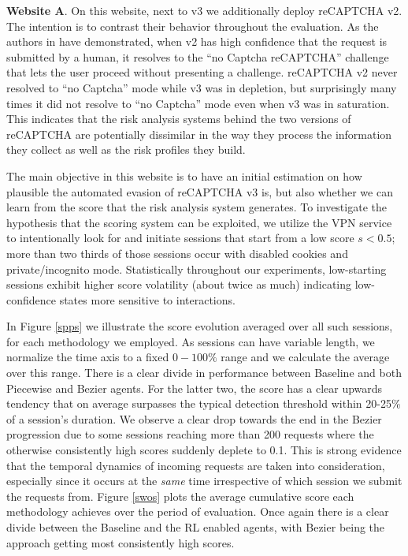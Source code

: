 \textbf{Website A}. On this website, next to v3 we additionally deploy reCAPTCHA v2.
The intention is to contrast their behavior throughout the evaluation.
As the authors in \cite{sivakorn2016robot} have demonstrated, when v2 has high confidence that the request is submitted by a human, it resolves to the ``no Captcha reCAPTCHA'' challenge that lets the user proceed without presenting a challenge.
reCAPTCHA v2 never resolved to ``no Captcha'' mode while v3 was in depletion, but surprisingly many times it did not resolve to ``no Captcha'' mode even when v3 was in saturation.
This indicates that the risk analysis systems behind the two versions of reCAPTCHA are potentially dissimilar in the way they process the information they collect as well as the risk profiles they build.

The main objective in this website is to have an initial estimation on how plausible the automated evasion of reCAPTCHA v3 is, but also whether we can learn from the score that the risk analysis system generates.
To investigate the hypothesis that the scoring system can be exploited, we utilize the VPN service to intentionally look for and initiate sessions that start from a low score $s < 0.5$; more than two thirds of those sessions occur with disabled cookies and private/incognito mode.
Statistically throughout our experiments, low-starting sessions exhibit higher score volatility (about twice as much) indicating low-confidence states more sensitive to interactions.

In Figure \ref{spps} we illustrate the score evolution averaged over all such sessions, for each methodology we employed.
As sessions can have variable length, we normalize the time axis to a fixed $0-100\%$ range and we calculate the average over this range.
There is a clear divide in performance between Baseline and both Piecewise and Bezier agents.
For the latter two, the score has a clear upwards tendency that on average surpasses the typical detection threshold within 20-25\% of a session's duration.
We observe a clear drop towards the end in the Bezier progression due to some sessions reaching more than 200 requests where the otherwise consistently high scores suddenly deplete to 0.1.
This is strong evidence that the temporal dynamics of incoming requests are taken into consideration, especially since it occurs at the \emph{same} time irrespective of which session we submit the requests from.
Figure \ref{swos} plots the average cumulative score each methodology achieves over the period of evaluation.
Once again there is a clear divide between the Baseline and the \gls{RL} enabled agents, with Bezier being the approach getting most consistently high scores.

